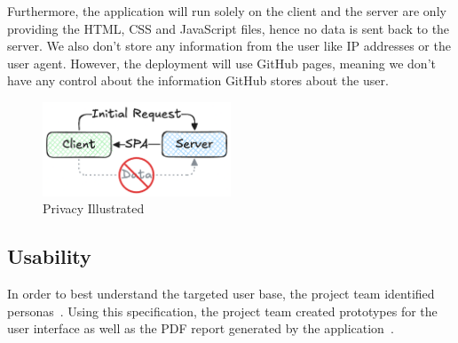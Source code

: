 Furthermore, the application will run solely on the client and the server are only providing the HTML,
CSS and JavaScript files, hence no data is sent back to the server.
We also don't store any information from the user like IP addresses or the user agent.
However, the deployment will use GitHub pages, meaning we don't have any control about the information GitHub stores about the user.

\begin{figure}[H]
    \centering
    \includegraphics[width=0.5\textwidth]{../assets/privacy_illustrated.png}
    \caption{Privacy Illustrated}\label{fig:privacy_illustrated}
\end{figure}

\subsection{Usability}\label{subsec:usability}
In order to best understand the targeted user base, the project team identified personas~.
Using this specification, the project team created prototypes for the user interface as well as the PDF report generated by the application~.

